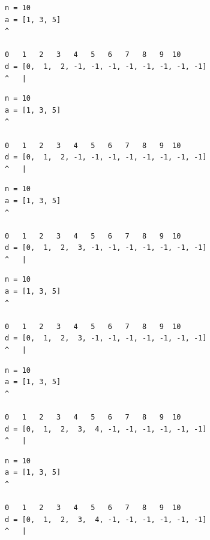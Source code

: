 \begin{frame}[fragile]
\begin{verbatim}
n = 10
a = [1, 3, 5]
^

0   1   2   3   4   5   6   7   8   9  10
d = [0,  1,  2, -1, -1, -1, -1, -1, -1, -1, -1]
^   |
\end{verbatim}
\end{frame}
\addtocounter{framenumber}{-1}

\begin{frame}[fragile]
\begin{verbatim}
n = 10
a = [1, 3, 5]
^

0   1   2   3   4   5   6   7   8   9  10
d = [0,  1,  2, -1, -1, -1, -1, -1, -1, -1, -1]
^   |
\end{verbatim}
\end{frame}
\addtocounter{framenumber}{-1}

\begin{frame}[fragile]
\begin{verbatim}
n = 10
a = [1, 3, 5]
^

0   1   2   3   4   5   6   7   8   9  10
d = [0,  1,  2,  3, -1, -1, -1, -1, -1, -1, -1]
^   |
\end{verbatim}
\end{frame}
\addtocounter{framenumber}{-1}

\begin{frame}[fragile]
\begin{verbatim}
n = 10
a = [1, 3, 5]
^

0   1   2   3   4   5   6   7   8   9  10
d = [0,  1,  2,  3, -1, -1, -1, -1, -1, -1, -1]
^   |
\end{verbatim}
\end{frame}
\addtocounter{framenumber}{-1}

\begin{frame}[fragile]
\begin{verbatim}
n = 10
a = [1, 3, 5]
^

0   1   2   3   4   5   6   7   8   9  10
d = [0,  1,  2,  3,  4, -1, -1, -1, -1, -1, -1]
^   |
\end{verbatim}
\end{frame}
\addtocounter{framenumber}{-1}

\begin{frame}[fragile]
\begin{verbatim}
n = 10
a = [1, 3, 5]
^

0   1   2   3   4   5   6   7   8   9  10
d = [0,  1,  2,  3,  4, -1, -1, -1, -1, -1, -1]
^   |
\end{verbatim}
\end{frame}
\addtocounter{framenumber}{-1}

